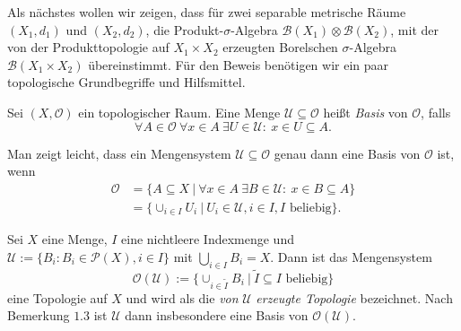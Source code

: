 Als nächstes wollen wir zeigen, dass für zwei separable metrische Räume $(X_1, d_1)$ und $(X_2,d_2)$, die Produkt-$\sigma$-Algebra
$\mathcal{B}(X_1) \otimes \mathcal{B}(X_2)$, mit der von der Produkttopologie auf $X_1 \times X_2$ erzeugten Borelschen $\sigma$-Algebra $\mathcal{B}(X_1 \times X_2)$ übereinstimmt. 
Für den Beweis benötigen wir ein paar topologische Grundbegriffe und Hilfsmittel.
\begin{mydef}
    Sei $(X, \mathcal{O})$ ein topologischer Raum. Eine Menge $\mathcal{U} \subseteq \mathcal{O}$ heißt \textit{Basis} von $\mathcal{O}$, falls
    $$
        \forall A \in \mathcal{O} \ \forall x \in A \ \exists U \in \mathcal{U}: \ x \in U \subseteq A. 
    $$
\end{mydef}

\begin{remark}
    Man zeigt leicht, dass ein Mengensystem $\mathcal{U} \subseteq \mathcal{O}$ genau dann eine Basis von $\mathcal{O}$ ist, wenn
    \begin{align*}
        \mathcal{O} &= \{A \subseteq X \ | \ \forall x \in A \ \exists B \in \mathcal{U}: \ x \in B \subseteq A\} \\\
                    &= \{\cup_{i \in I}U_i \ | \ U_i \in \mathcal{U}, i \in I, I \text{ beliebig} \}. 
    \end{align*}
\end{remark}

\begin{lemma}
    Sei $X$ eine Menge, $I$ eine nichtleere Indexmenge und $\mathcal{U} := \{B_i: B_i \in \mathcal{P}(X), i \in I\}$ mit $\bigcup_{i \in I} B_i = X$. Dann ist das Mengensystem 
    $$
        \mathcal{O}(\mathcal{U}) := \{\cup_{i \in \tilde{I}}B_i \ | \  \tilde{I} \subseteq I \text{ beliebig} \}
    $$
    eine Topologie auf $X$ und wird als die \textit{von} $\mathcal{U}$ \textit{erzeugte Topologie} bezeichnet.  Nach Bemerkung $1.3$ ist $\mathcal{U}$ dann insbesondere eine Basis von $\mathcal{O}(\mathcal{U})$. 
\end{lemma}

